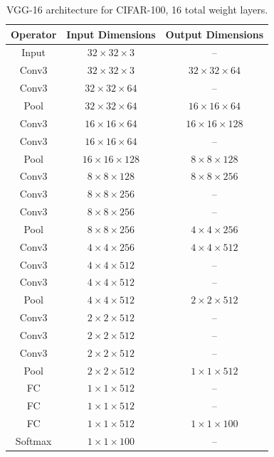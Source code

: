 \documentclass[10pt, a4paper]{article}
\begin{document}
\begin{table}[H]
\centering
\small
\renewcommand{\arraystretch}{0.8}
\begin{tabular}{|c|c|c|}
	\hline
	\textbf{Operator} & \textbf{Input Dimensions} & \textbf{Output Dimensions}\\
    \hline
    Input & $32 \times 32 \times 3 $&-- \\
    \hline
    Conv3 & $ 32 \times 32 \times 3 $ & $ 32 \times 32 \times 64 $ \\
    Conv3 & $ 32 \times 32 \times 64 $ & -- \\
    Pool & $ 32 \times 32 \times 64 $ & $ 16 \times 16 \times 64 $ \\
    \hline

    Conv3 & $ 16 \times 16 \times 64 $ & $ 16 \times 16 \times 128 $ \\
    Conv3 & $ 16 \times 16 \times 64 $ & -- \\
    Pool & $ 16 \times 16 \times 128 $ & $ 8 \times 8 \times 128 $ \\
    \hline

    Conv3 & $ 8 \times 8 \times 128 $ & $ 8 \times 8 \times 256 $ \\
    Conv3 & $ 8 \times 8 \times 256 $ & -- \\
    Conv3 & $ 8 \times 8 \times 256 $ & -- \\
    Pool & $ 8 \times 8 \times 256 $ & $ 4 \times 4 \times 256 $ \\
    \hline

    Conv3 & $ 4 \times 4 \times 256 $ & $ 4 \times 4 \times 512 $ \\
    Conv3 & $ 4 \times 4 \times 512 $ & -- \\
    Conv3 & $ 4 \times 4 \times 512 $ & -- \\
    Pool & $ 4 \times 4 \times 512 $ & $ 2 \times 2 \times 512 $ \\
    \hline

    Conv3 & $ 2 \times 2 \times 512 $ & -- \\
    Conv3 & $ 2 \times 2 \times 512 $ & -- \\
    Conv3 & $ 2 \times 2 \times 512 $ & -- \\
    Pool & $ 2 \times 2 \times 512 $ & $ 1 \times 1 \times 512 $ \\
    \hline

    FC & $1\times1\times512$ & -- \\
    FC & $1\times1\times512$ & -- \\
    FC & $1\times1\times512$ & $1\times1\times100$ \\
    \hline
    Softmax & $1\times1\times100$&--\\
    \hline
\end{tabular}
\caption{VGG-16 architecture for CIFAR-100, 16 total weight layers.}
\end{table}
\end{document}
